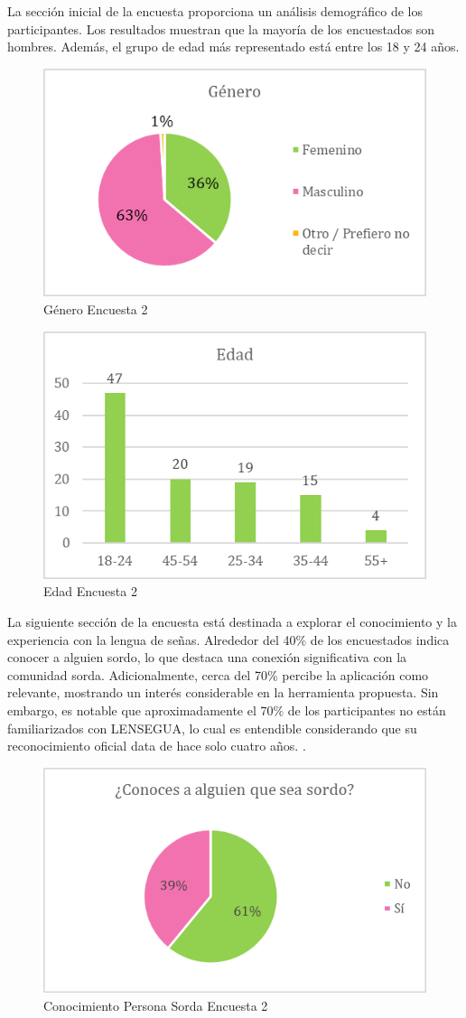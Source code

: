 La sección inicial de la encuesta proporciona un análisis demográfico de los participantes. Los resultados muestran que la mayoría de los encuestados son hombres. Además, el grupo de edad más representado está entre los 18 y 24 años. 

\begin{figure} [H]
    \centering
    \includegraphics[width=0.5\linewidth]{figuras/encuesta_genero.png}
    \caption{Género Encuesta 2}
    \label{fig:enter-label}
\end{figure}

\begin{figure} [H]
    \centering
    \includegraphics[width=0.5\linewidth]{figuras/encuesta_edad.png}
    \caption{Edad Encuesta 2}
    \label{fig:enter-label}
\end{figure}

La siguiente sección de la encuesta está destinada a explorar el conocimiento y la experiencia con la lengua de señas. Alrededor del 40\% de los encuestados indica conocer a alguien sordo, lo que destaca una conexión significativa con la comunidad sorda. Adicionalmente, cerca del 70\% percibe la aplicación como relevante, mostrando un interés considerable en la herramienta propuesta. Sin embargo, es notable que aproximadamente el 70\% de los participantes no están familiarizados con LENSEGUA, lo cual es entendible considerando que su reconocimiento oficial data de hace solo cuatro años. \cite{CongresoGuatemala2020}. 

\begin{figure} [H]
    \centering
    \includegraphics[width=0.5\linewidth]{figuras/conocimientoSordaEncuesta.png}
    \caption{Conocimiento Persona Sorda Encuesta 2}
    \label{fig:enter-label}
\end{figure}

